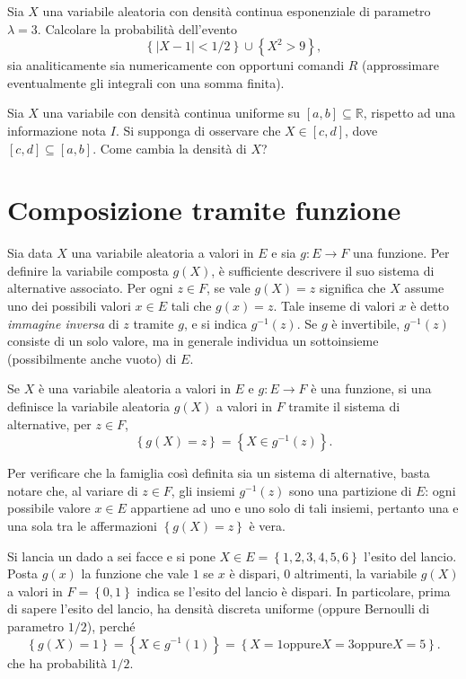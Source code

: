 \documentclass[
  italian,
  letterpaper,
]{book}
\newcommand{\cur}[1]{\left\{ #1 \right\}}
\newcommand{\R}{\mathbb{R}}
\theoremstyle{definition}
\theoremstyle{remark}
\begin{document}
Sia \(X\) una variabile aleatoria con densità continua esponenziale di
parametro \(\lambda = 3\). Calcolare la probabilità dell'evento
\[ \cur{ |X-1| <1/2} \cup \cur{ X^2 >9},\] sia analiticamente sia
numericamente con opportuni comandi \(R\) (approssimare eventualmente
gli integrali con una somma finita).

Sia \(X\) una variabile con densità continua uniforme su
\([a,b] \subseteq \R\), rispetto ad una informazione nota \(I\). Si
supponga di osservare che \(X \in [c,d]\), dove
\([c,d ]\subseteq [a,b]\). Come cambia la densità di \(X\)?

\section{Composizione tramite funzione}\label{sec-composizione}

Sia data \(X\) una variabile aleatoria a valori in \(E\) e sia
\(g: E \to F\) una funzione. Per definire la variabile composta
\(g(X)\), è sufficiente descrivere il suo sistema di alternative
associato. Per ogni \(z \in F\), se vale \(g(X) = z\) significa che
\(X\) assume uno dei possibili valori \(x\in E\) tali che \(g(x) = z\).
Tale inseme di valori \(x\) è detto \emph{immagine inversa} di \(z\)
tramite \(g\), e si indica \(g^{-1}(z)\). Se \(g\) è invertibile,
\(g^{-1}(z)\) consiste di un solo valore, ma in generale individua un
sottoinsieme (possibilmente anche vuoto) di \(E\).

Se \(X\) è una variabile aleatoria a valori in \(E\) e \(g: E \to F\) è
una funzione, si una definisce la variabile aleatoria \(g(X)\) a valori
in \(F\) tramite il sistema di alternative, per \(z \in F\),
\[ \cur{ g(X) = z} =  \cur{X \in g^{-1}(z)}.\]

Per verificare che la famiglia così definita sia un sistema di
alternative, basta notare che, al variare di \(z \in F\), gli insiemi
\(g^{-1}(z)\) sono una partizione di \(E\): ogni possibile valore
\(x \in E\) appartiene ad uno e uno solo di tali insiemi, pertanto una e
una sola tra le affermazioni \(\cur{g(X) = z}\) è vera.

Si lancia un dado a sei facce e si pone \(X \in E= \cur{1,2,3,4,5,6}\)
l'esito del lancio. Posta \(g(x)\) la funzione che vale \(1\) se \(x\) è
dispari, \(0\) altrimenti, la variabile \(g(X)\) a valori in
\(F=\cur{0,1}\) indica se l'esito del lancio è dispari. In particolare,
prima di sapere l'esito del lancio, ha densità discreta uniforme (oppure
Bernoulli di parametro \(1/2\)), perché
\[ \cur{ g(X)  =1 } = \cur{ X \in g^{-1}(1)} = \cur{ X = 1 \text{oppure} X=3 \text{oppure} X =5}.\]
che ha probabilità \(1/2\).
\end{document}

